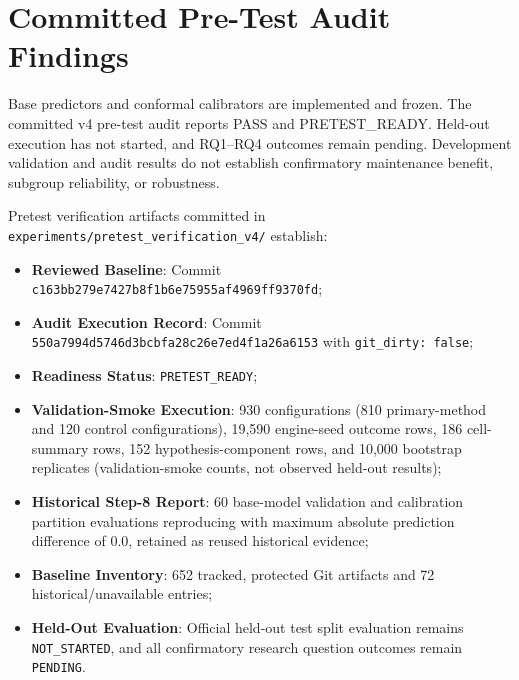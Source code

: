 \section{Committed Pre-Test Audit Findings}
Base predictors and conformal calibrators are implemented and frozen. The committed v4 pre-test audit reports PASS and PRETEST\_READY. Held-out execution has not started, and RQ1–RQ4 outcomes remain pending. Development validation and audit results do not establish confirmatory maintenance benefit, subgroup reliability, or robustness.

Pretest verification artifacts committed in \texttt{experiments/pretest\_verification\_v4/} establish:
\begin{itemize}
    \item \textbf{Reviewed Baseline}: Commit \texttt{c163bb279e7427b8f1b6e75955af4969ff9370fd};
    \item \textbf{Audit Execution Record}: Commit \texttt{550a7994d5746d3bcbfa28c26e7ed4f1a26a6153} with \texttt{git\_dirty: false};
    \item \textbf{Readiness Status}: \texttt{PRETEST\_READY};
    \item \textbf{Validation-Smoke Execution}: 930 configurations (810 primary-method and 120 control configurations), 19,590 engine-seed outcome rows, 186 cell-summary rows, 152 hypothesis-component rows, and 10,000 bootstrap replicates (validation-smoke counts, not observed held-out results);
    \item \textbf{Historical Step-8 Report}: 60 base-model validation and calibration partition evaluations reproducing with maximum absolute prediction difference of $0.0$, retained as reused historical evidence;
    \item \textbf{Baseline Inventory}: 652 tracked, protected Git artifacts and 72 historical/unavailable entries;
    \item \textbf{Held-Out Evaluation}: Official held-out test split evaluation remains \texttt{NOT\_STARTED}, and all confirmatory research question outcomes remain \texttt{PENDING}.
\end{itemize}

